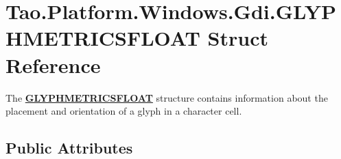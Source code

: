 \hypertarget{struct_tao_1_1_platform_1_1_windows_1_1_gdi_1_1_g_l_y_p_h_m_e_t_r_i_c_s_f_l_o_a_t}{
\section{Tao.Platform.Windows.Gdi.GLYPHMETRICSFLOAT Struct Reference}
\label{struct_tao_1_1_platform_1_1_windows_1_1_gdi_1_1_g_l_y_p_h_m_e_t_r_i_c_s_f_l_o_a_t}
}


The {\bfseries \hyperlink{struct_tao_1_1_platform_1_1_windows_1_1_gdi_1_1_g_l_y_p_h_m_e_t_r_i_c_s_f_l_o_a_t}{GLYPHMETRICSFLOAT}} structure contains information about the placement and orientation of a glyph in a character cell.  


\subsection*{Public Attributes}
